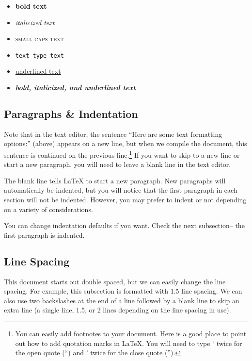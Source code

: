 \documentclass[12pt,notitlepage]{article}		%
\begin{document}
\begin{itemize}

\item \textbf{bold text}

\item \textit{italicized text}

\item \textsc{small caps text}

\item \texttt{text type text}

\item \underline{underlined text}

\item \textbf{\textit{\underline{bold, italicized, and underlined text}}}

\end{itemize}

\subsection{Paragraphs \& Indentation}

Note that in the text editor, the sentence ``Here are some text formatting options:'' (above) appears on a new line, but when we compile the document, this sentence is continued on the previous line.\footnote{You can easily add footnotes to your document.  Here is a good place to point out how to add quotation marks in LaTeX.  You will need to type ` twice for the open quote (``) and ' twice for the close quote ('').}   If you want to skip to a new line or start a new paragraph, you will need to leave a blank line in the text editor.

The blank line tells LaTeX to start a new paragraph.  New paragraphs will automatically be indented, but you will notice that the first paragraph in each section will not be indented.  However, you may prefer to indent or not depending on a variety of considerations.  

\noindent
You can change indentation defaults if you want.  Check the next subsection-- the first paragraph is indented.


\subsection{Line Spacing}

\onehalfspacing

\indent

This document starts out double spaced, but we can easily change the line spacing.  For example, this subsection is formatted with 1.5 line spacing.  We can also use two backslashes at the end of a line followed by a blank line to skip an extra line (a single line, 1.5, or 2 lines depending on the line spacing in use).\\
\end{document}
